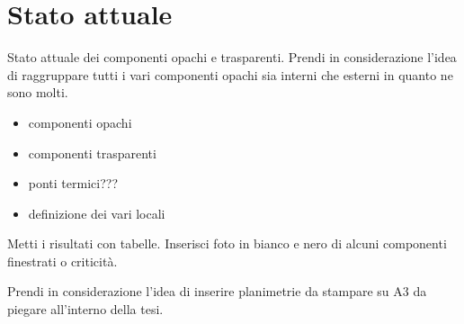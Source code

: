 \chapter{Stato attuale}
\thispagestyle{empty}
Stato attuale dei componenti opachi e trasparenti. Prendi in considerazione l'idea di raggruppare tutti i vari componenti opachi sia interni che esterni in quanto ne sono molti.
\begin{itemize}
	\item componenti opachi
	\item componenti trasparenti
	\item ponti termici???
	\item definizione dei vari locali
\end{itemize}
Metti i risultati con tabelle. 
Inserisci foto in bianco e nero di alcuni componenti finestrati o criticità.

Prendi in considerazione l'idea di inserire planimetrie da stampare su A3 da piegare all'interno della tesi. 